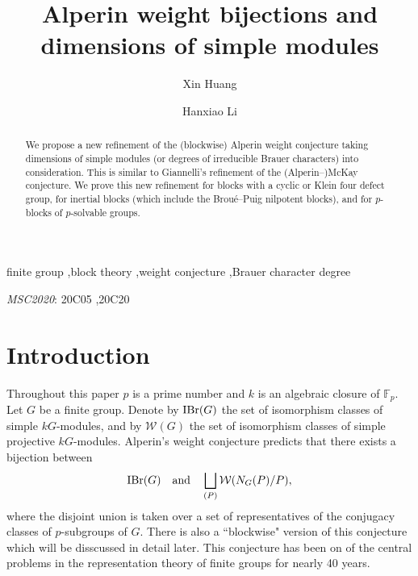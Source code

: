 \documentclass[preprint,12pt,3p]{elsarticle}
\makeatletter
\def\IBr{{\rm IBr}}
\def\W{\mathcal{W}}
\def\F{\mathbb{F}}
\newcommand{\dedication}[1]{\g@addto@macro\elsauthors{\par\medskip{\normalsize\itshape #1}\par}}
\makeatother
\begin{document}
\begin{frontmatter}
	
	\title{Alperin weight bijections and dimensions of simple modules}
	
	
	
	\author{Xin Huang}

	

\author{Hanxiao Li}
	
	\begin{abstract}
We propose a new refinement of the (blockwise) Alperin weight conjecture taking dimensions of simple modules (or degrees of irreducible Brauer characters) into consideration. This is similar to Giannelli's refinement of the (Alperin--)McKay conjecture. We prove this new refinement for blocks with a cyclic or Klein four defect group, for inertial blocks (which include the Brou\'{e}--Puig nilpotent blocks), and for $p$-blocks of $p$-solvable groups.
\end{abstract}
	
	\begin{keyword}
finite group \sep block theory \sep weight conjecture \sep Brauer character degree

\textit{MSC2020}: 20C05 \sep 20C20
	\end{keyword}
	
\end{frontmatter}


\section{Introduction}\label{s1}
Throughout this paper $p$ is a prime number and $k$ is an algebraic closure of $\F_p$. Let $G$ be a finite group. Denote by $\IBr(G)$ the set of isomorphism classes of simple $kG$-modules, and by $\W(G)$ the set of isomorphism classes of simple projective $kG$-modules. Alperin's weight conjecture predicts that there exists a bijection between
$$\IBr(G)~~~{\rm and}~~~\bigsqcup_{(P)}\W(N_G(P)/P),$$
where the disjoint union is taken over a set of representatives of the conjugacy classes of $p$-subgroups of $G$. 
There is also a ``blockwise" version of this conjecture which will be disscussed in detail later. This conjecture has been on of the central problems in the representation theory of finite groups for nearly 40 years.
\end{document}
